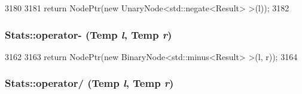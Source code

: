 \begin{DoxyCode}
3180 {
3181     return NodePtr(new UnaryNode<std::negate<Result> >(l));
3182 }
\end{DoxyCode}
\hypertarget{namespaceStats_a9f11fd33efc0c7c48e3bf613faa5f859}{
\subsubsection[{operator-\/}]{ Stats::operator-\/ (Temp {\em l}, \/  Temp {\em r})}}
\label{namespaceStats_a9f11fd33efc0c7c48e3bf613faa5f859}



\begin{DoxyCode}
3162 {
3163     return NodePtr(new BinaryNode<std::minus<Result> >(l, r));
3164 }
\end{DoxyCode}
\hypertarget{namespaceStats_a4503ae7ebd767375e5beef0eb2090eb0}{
\subsubsection[{operator/}]{ Stats::operator/ (Temp {\em l}, \/  Temp {\em r})}}
\label{namespaceStats_a4503ae7ebd767375e5beef0eb2090eb0}



